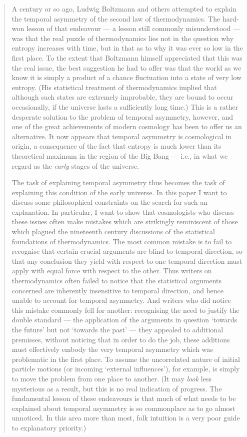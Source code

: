 \documentclass{article}
\begin{document}
\begin{quote}
A century or so ago, Ludwig Boltzmann and others attempted to explain
the temporal asymmetry of the second law of thermodynamics. The hard-won
lesson of that endeavour --- a lesson still commonly misunderstood ---
was that the real puzzle of thermodynamics lies not in the question why
entropy increases with time, but in that as to why it was ever so low in
the first place. To the extent that Boltzmann himself appreciated that
this was the real issue, the best suggestion he had to offer was that
the world as we know it is simply a product of a chance fluctuation into
a state of very low entropy. (His statistical treatment of
thermodynamics implied that although such states are extremely
improbable, they are bound to occur occasionally, if the universe lasts
a sufficiently long time.) This is a rather desperate solution to the
problem of temporal asymmetry, however, and one of the great
achievements of modern cosmology has been to offer us an alternative. It
now appears that temporal asymmetry is cosmological in origin, a
consequence of the fact that entropy is much lower than its theoretical
maximum in the region of the Big Bang --- i.e., in what we regard as the
\emph{early} stages of the universe.

The task of explaining temporal asymmetry thus becomes the task of
explaining this condition of the early universe. In this paper I want to
discuss some philosophical constraints on the search for such an
explanation. In particular, I want to show that cosmologists who discuss
these issues often make mistakes which are strikingly reminiscent of
those which plagued the nineteenth century discussions of the
statistical foundations of thermodynamics. The most common mistake is to
fail to recognise that certain crucial arguments are blind to temporal
direction, so that any conclusion they yield with respect to one
temporal direction must apply with equal force with respect to the
other. Thus writers on thermodynamics often failed to notice that the
statistical arguments concerned are inherently insensitive to temporal
direction, and hence unable to account for temporal asymmetry. And
writers who did notice this mistake commonly fell for another:
recognising the need to justify the double standard --- the application
of the arguments in question `towards the future' but not `towards the
past' --- they appealed to additional premisses, without noticing that
in order to do the job, these additions must effectively embody the very
temporal asymmetry which was problematic in the first place. To assume
the uncorrelated nature of initial particle motions (or incoming
`external influences'), for example, is simply to move the problem from
one place to another. (It may \emph{look} less mysterious as a result,
but this is no real indication of progress. The fundamental lesson of
these endeavours is that much of what needs to be explained about
temporal asymmetry is so commonplace as to go almost unnoticed. In this
area more than most, folk intuition is a very poor guide to explanatory
priority.)


\end{quote}
\end{document}
